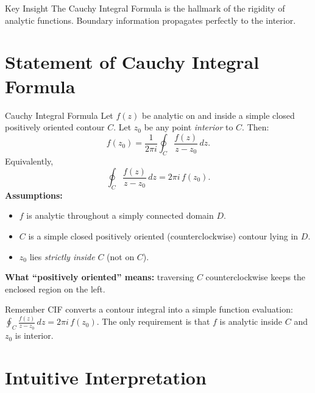 \documentclass[12pt,a4paper]{article}
\begin{document}
\begin{learnbox}{Key Insight}
The Cauchy Integral Formula is the hallmark of the rigidity of analytic functions.
Boundary information propagates perfectly to the interior.
\end{learnbox}

\section{Statement of Cauchy Integral Formula}

\begin{infobox}{Cauchy Integral Formula}
Let $f(z)$ be analytic on and inside a simple closed positively oriented contour $C$.
Let $z_0$ be any point \emph{interior} to $C$. Then:
\[
  f(z_0) = \frac{1}{2\pi i} \oint_{C} \frac{f(z)}{z - z_0}\,dz.
\]
Equivalently,
\[
  \oint_{C} \frac{f(z)}{z - z_0}\,dz = 2\pi i\, f(z_0).
\]
\textbf{Assumptions:}
\begin{itemize}[noitemsep]
  \item $f$ is analytic throughout a simply connected domain $D$.
  \item $C$ is a simple closed positively oriented (counterclockwise) contour lying in $D$.
  \item $z_0$ lies \emph{strictly inside} $C$ (not on $C$).
\end{itemize}
\end{infobox}

\medskip

\noindent\textbf{What ``positively oriented'' means:} traversing $C$
counterclockwise keeps the enclosed region on the left.

\begin{learnbox}{Remember}
CIF converts a contour integral into a simple function evaluation:
$\displaystyle\oint_{C} \frac{f(z)}{z - z_0}\,dz = 2\pi i\, f(z_0)$.
The only requirement is that $f$ is analytic inside $C$ and $z_0$ is interior.
\end{learnbox}

\section{Intuitive Interpretation}
\end{document}
